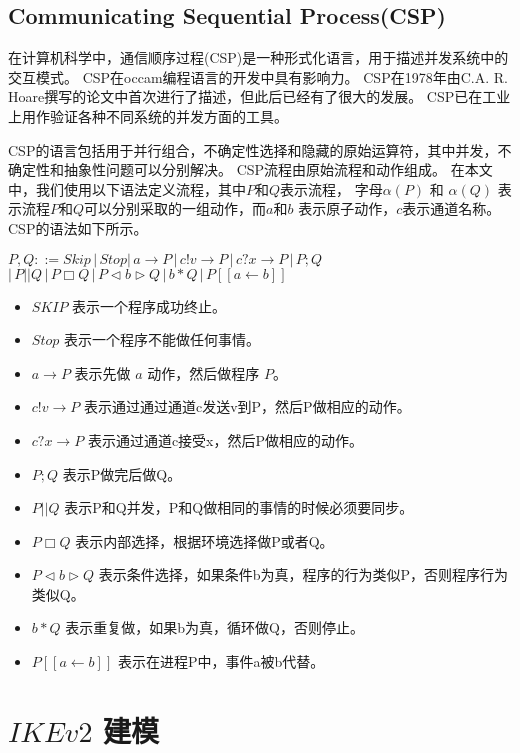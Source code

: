 \documentclass[UTF8]{ctexart}
\begin{document}
\subsection{Communicating Sequential Process(CSP)}
\par{
	在计算机科学中，通信顺序过程(CSP)是一种形式化语言，用于描述并发系统中的交互模式。 CSP在occam编程语言的开发中具有影响力。
	CSP在1978年由C.A. R. Hoare撰写的论文中首次进行了描述，但此后已经有了很大的发展。 CSP已在工业上用作验证各种不同系统的并发方面的工具。
	}
\par{CSP的语言包括用于并行组合，不确定性选择和隐藏的原始运算符，其中并发，不确定性和抽象性问题可以分别解决。
CSP流程由原始流程和动作组成。 在本文中，我们使用以下语法定义流程，其中$P$和$Q$表示流程，
字母$α(P)$ 和 $α(Q)$ 表示流程$P$和$Q$可以分别采取的一组动作，而$a$和$b$ 表示原子动作，$c$表示通道名称。
 CSP的语法如下所示。
\begin{center}
	$P,Q::=Skip \, | \, Stop |\,  a \rightarrow P\,  | \, c!v \rightarrow P \, |\,  c?x \rightarrow P \, | \, P;Q $
	\\ 
	\quad \quad \quad $ |\,  P||Q \, | \, P \Box Q \, | \, P \lhd b \rhd Q \, | \, b*Q \, | \, P[[a \leftarrow b]]$
\end{center}
\begin{itemize}
	\item $SKIP $ 表示一个程序成功终止。
	\item $Stop $ 表示一个程序不能做任何事情。
	\item $  a \rightarrow P $ 表示先做 $a$ 动作，然后做程序 $P$。
	\item $c!v \rightarrow P $ 表示通过通过通道c发送v到P，然后P做相应的动作。
	\item $c?x \rightarrow P$ 表示通过通道c接受x，然后P做相应的动作。
	\item $P;Q $ 表示P做完后做Q。
	\item $ P||Q $ 表示P和Q并发，P和Q做相同的事情的时候必须要同步。
	\item $P \Box Q$ 表示内部选择，根据环境选择做P或者Q。
	\item $P \lhd b \rhd Q$ 表示条件选择，如果条件b为真，程序的行为类似P，否则程序行为类似Q。
	\item $ b*Q $ 表示重复做，如果b为真，循环做Q，否则停止。
	\item $	P[[a \leftarrow b]] $ 表示在进程P中，事件a被b代替。

\end{itemize}
}


\section{$ IKEv2 $ 建模}
\end{document}
